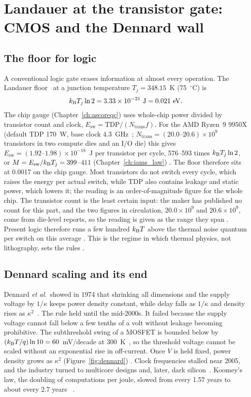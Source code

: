 \chapter{Landauer at the transistor gate: CMOS and the Dennard wall}\label{ch:cmos}

\section{The floor for logic}

A conventional logic gate erases information at almost every operation. The Landauer floor~\cite{Landauer1961} at
a junction temperature $T_j=348.15$~K (75~$^\circ$C) is
\begin{equation}
 k_{\mathrm B} T_j\ln2=3.33\times10^{-21}\ \mathrm J=0.021\ \mathrm{eV}.
\end{equation}
The chip gauge (Chapter~\ref{ch:ascoreqc}) uses whole-chip power divided by transistor count and clock,
$E_{\mathrm{sw}}=\mathrm{TDP}/(N_{\mathrm{trans}}f)$. For the AMD Ryzen~9 9950X (default TDP 170~W, base clock 4.3~GHz~\cite{AMD9950X};
$N_{\mathrm{trans}}=(20.0\text{--}20.6)\times10^9$ transistors in two compute dies and an I/O die) this gives $E_{\mathrm{sw}}=(1.92\text{--}1.98)\times10^{-18}$~J
per transistor per cycle, 576--593 times $k_{\mathrm B} T_j\ln2$, or $M=E_{\mathrm{sw}}/k_{\mathrm B} T_j=399$--$411$ (Chapter~\ref{ch:iams_law}) \calc. The
floor therefore sits at 0.0017 on the chip gauge. Most transistors do not switch every cycle,
which raises the energy per actual switch, while TDP also contains leakage and static power, which lowers it; the reading is an
order-of-magnitude figure for the whole chip. The transistor count is the least certain input: the maker has published no count for this part, and the two figures in
circulation, $20.0\times10^9$ and $20.6\times10^9$, come from die-level reports, so the reading is given as the range they span \openprob. Present logic therefore runs a few hundred $k_{\mathrm B} T$ above the thermal noise quantum per
switch on this average \calc. This is the regime in which thermal physics, not lithography, sets the rules \interp.

\section{Dennard scaling and its end}

Dennard \emph{et al.}\ showed in 1974 that shrinking all dimensions and the supply voltage by
$1/\kappa$ keeps power density constant, while delay falls as $1/\kappa$ and density rises
as $\kappa^2$~\cite{Dennard1974}. The rule held until the mid-2000s. It failed because the
supply voltage cannot fall below a few tenths of a volt without leakage becoming prohibitive.
The subthreshold swing of a MOSFET is bounded below by $(k_{\mathrm B} T/q)\ln10=60$~mV/decade at
300~K~\cite{Sze2006}, so the threshold voltage cannot be scaled without an exponential rise
in off-current. Once $V$ is held fixed, power density grows as $\kappa^2$
(Figure~\ref{fig:dennard}) \derived. Clock frequencies stalled near 2005, and the industry turned to
multicore designs and, later, dark silicon~\cite{Esmaeilzadeh2011}. Koomey's law, the doubling
of computations per joule, slowed from every 1.57 years to about every 2.7 years~\cite{Koomey2011,Koomey2016} \observed.

